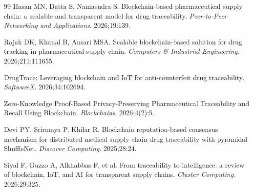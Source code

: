 \documentclass[11pt,a4paper]{article}
\begin{document}
\begin{thebibliography}{99}
Hasan MN, Datta S, Namasudra S. Blockchain-based pharmaceutical supply chain: a scalable and transparent model for drug traceability. \textit{Peer-to-Peer Networking and Applications}. 2026;19:139.

Rajak DK, Khanal B, Ansari MSA. Scalable blockchain-based solution for drug tracking in pharmaceutical supply chain. \textit{Computers \& Industrial Engineering}. 2026;211:111655.

DrugTrace: Leveraging blockchain and IoT for anti-counterfeit drug traceability. \textit{SoftwareX}. 2026;34:102694.

Zero-Knowledge Proof-Based Privacy-Preserving Pharmaceutical Traceability and Recall Using Blockchain. \textit{Blockchains}. 2026;4(2):5.

Devi PY, Sriramya P, Khilar R. Blockchain reputation-based consensus mechanism for distributed medical supply chain drug traceability with pyramidal ShuffleNet. \textit{Discover Computing}. 2025;28:24.

Siyal F, Guzzo A, Alkhabbas F, et al. From traceability to intelligence: a review of blockchain, IoT, and AI for transparent supply chains. \textit{Cluster Computing}. 2026;29:325.

\end{thebibliography}
\end{document}
